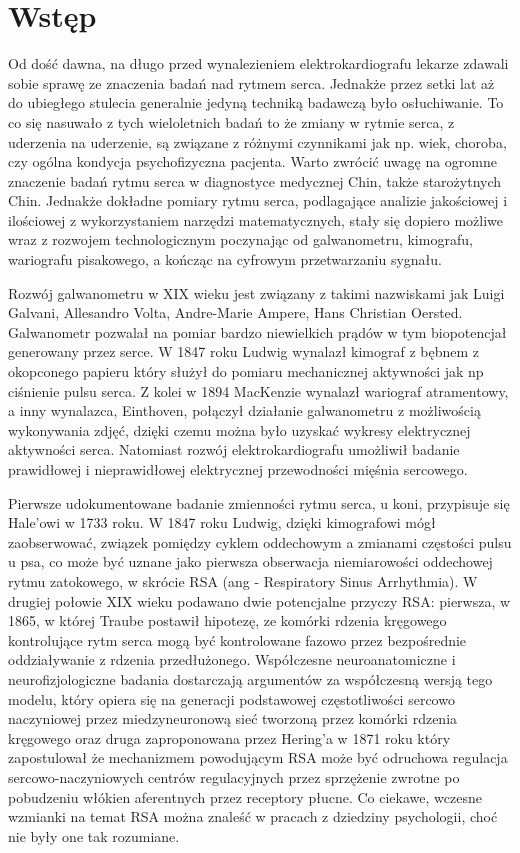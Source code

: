 \chapter*{Wstęp}

Od dość dawna, na długo przed wynalezieniem elektrokardiografu lekarze zdawali sobie
sprawę ze znaczenia badań nad rytmem serca. Jednakże przez setki lat aż do ubiegłego
stulecia generalnie jedyną techniką badawczą było osłuchiwanie. To co się nasuwało
z tych wieloletnich badań to że zmiany w rytmie serca, z uderzenia na uderzenie,
są związane z różnymi czynnikami jak np. wiek, choroba, czy ogólna kondycja
psychofizyczna pacjenta. Warto zwrócić uwagę na ogromne znaczenie badań rytmu serca w
diagnostyce medycznej Chin, także starożytnych Chin. Jednakże dokładne pomiary rytmu
serca, podlagające analizie jakościowej i ilościowej z wykorzystaniem narzędzi
matematycznych, stały się dopiero możliwe wraz z rozwojem technologicznym poczynając
od galwanometru, kimografu, wariografu pisakowego, a kończąc na cyfrowym przetwarzaniu
sygnału.

Rozwój galwanometru w XIX wieku jest związany z takimi nazwiskami jak Luigi Galvani,
Allesandro Volta, Andre-Marie Ampere, Hans Christian Oersted. Galwanometr pozwalał na
pomiar bardzo niewielkich prądów w tym biopotencjał generowany przez serce.
W 1847 roku Ludwig wynalazł kimograf z bębnem z okopconego papieru który służył
do pomiaru mechanicznej aktywności jak np ciśnienie pulsu serca. Z kolei w 1894
MacKenzie wynalazł wariograf atramentowy, a inny wynalazca, Einthoven,
połączył działanie galwanometru z możliwością wykonywania zdjęć, dzięki czemu
można było uzyskać wykresy elektrycznej aktywności serca. Natomiast rozwój
elektrokardiografu umożliwił badanie prawidłowej i nieprawidłowej elektrycznej
przewodności mięśnia sercowego.

Pierwsze udokumentowane badanie zmienności rytmu serca, u koni, przypisuje się Hale'owi
w 1733 roku. W 1847 roku Ludwig, dzięki kimografowi mógł zaobserwować, związek
pomiędzy cyklem oddechowym a zmianami częstości pulsu u psa,
co może być uznane jako pierwsza obserwacja niemiarowości oddechowej rytmu zatokowego,
w skrócie RSA (ang - Respiratory Sinus Arrhythmia). W drugiej połowie XIX wieku
podawano dwie potencjalne przyczy RSA: pierwsza, w 1865, w której Traube postawił
hipotezę, ze komórki rdzenia kręgowego kontrolujące rytm serca mogą być kontrolowane
fazowo przez bezpośrednie oddziaływanie z rdzenia przedłużonego. Współczesne
neuroanatomiczne i neurofizjologiczne badania dostarczają argumentów za współczesną
wersją tego modelu, który opiera się na generacji podstawowej częstotliwości sercowo
naczyniowej przez miedzyneuronową sieć tworzoną przez komórki rdzenia kręgowego
oraz druga zaproponowana przez Hering'a w 1871 roku który zapostulował że mechanizmem
powodującym RSA może być odruchowa regulacja sercowo-naczyniowych centrów
regulacyjnych przez sprzężenie zwrotne po pobudzeniu włókien aferentnych przez
receptory płucne. Co ciekawe, wczesne wzmianki na temat RSA można znaleść w pracach z
dziedziny psychologii, choć nie były one tak rozumiane.

